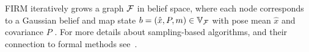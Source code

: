 \documentclass[conference]{IEEEtran}
\begin{document}
FIRM iteratively grows a graph $\mathcal{F}$ in belief space, where each node corresponds to a Gaussian belief and map state $b = (\hat{x},P, m) \in \mathbb{V}_{\mathcal{F}}$ with pose mean $\hat{x}$ and covariance $P$ \cite{Agha14}. For more details about sampling-based algorithms, and their connection to formal methods see~\cite{Lav06,KF-IJRR11,VaBe-IROS-2013}. %





\end{document}
